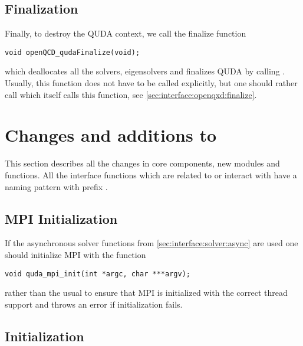 \subsection{Finalization}
\label{sec:interface:quda:finalize}


Finally, to destroy the QUDA context, we call the finalize function
\begin{verbatim}
void openQCD_qudaFinalize(void);
\end{verbatim}
which deallocates all the solvers, eigensolvers and finalizes QUDA by calling . Usually, this function does not have to be called explicitly, but one should rather call  which itself calls this function, see \cref{sec:interface:openqxd:finalize}.

\section{Changes and additions to \openqxd}
\label{sec:interface:openqxd}

This section describes all the changes in \openqxd core components, new modules and functions.
All the interface functions which are related to or interact with \quda have a naming pattern with prefix .

\subsection{MPI Initialization}
\label{sec:interface:openqxd:mpi:init}


If the asynchronous solver functions from \cref{sec:interface:solver:async} are used one should initialize MPI with the function
\begin{verbatim}
void quda_mpi_init(int *argc, char ***argv);
\end{verbatim}
rather than the usual  to ensure that MPI is initialized with the correct thread support and throws an error if initialization fails.

\subsection{Initialization}
\label{sec:interface:openqxd:init}

